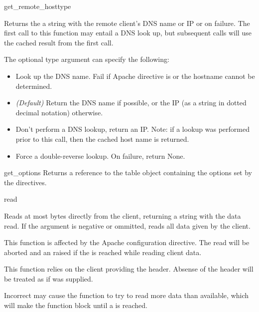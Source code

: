 \begin{methoddesc}[Request]{get_remote_host}{type}

Returns the a string with the remote client's DNS name or IP or
 on failure. The first call to this function may entail a
DNS look up, but subsequent calls will use the cached result from the
first call.

The optional type argument can specify the following: 

\begin{itemize}

\item
{} Look up the DNS name. Fail if Apache 
directive  is  or the hostname cannot
be determined.

\item                  
{} \emph{(Default)} Return the DNS name if
possible, or the IP (as a string in dotted decimal notation)
otherwise.

\item
{} Don't perform a DNS lookup, return an
IP. Note: if a lookup was performed prior to this call, then the
cached host name is returned.

\item
{} Force a double-reverse lookup. On 
failure, return None.

\end{itemize}

\end{methoddesc}

\begin{methoddesc}[Request]{get_options}{}
Returns a reference to the table object containing the options set by
the  directives.
\end{methoddesc}


\begin{methoddesc}[Request]{read}{}

Reads at most  bytes directly from the client, returning a
string with the data read. If the  argument is negative or
ommitted, reads all data given by the client.

This function is affected by the  Apache configuration
directive. The read will be aborted and an  raised
if the  is reached while reading client data.

This function relies on the client providing the 
header. Absense of the  header will be treated as
if  was supplied.

Incorrect  may cause the function to try to read
more data than available, which will make the function block until a
 is reached.

\end{methoddesc}

